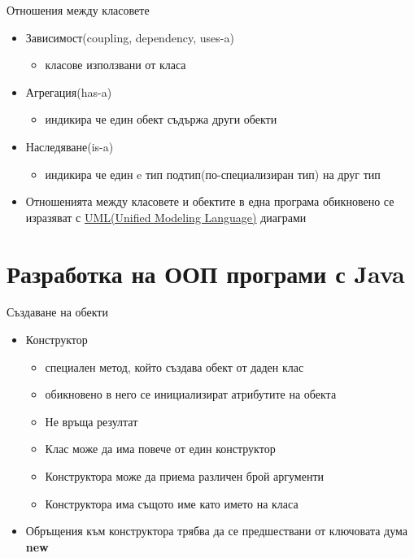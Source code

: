 \documentclass{beamer}
\begin{document}
\begin{frame}{Отношения между класовете}
  \transdissolve
  \begin{itemize}
  \item Зависимост(coupling, dependency, uses-a) \pause
    \begin{itemize}
    \item класове използвани от класа \pause
    \end{itemize}
  \item Агрегация(has-a) \pause
    \begin{itemize}
    \item индикира че един обект съдържа други обекти \pause
    \end{itemize}
  \item Наследяване(is-a) \pause
    \begin{itemize}
    \item индикира че един e тип подтип(по-специализиран тип) на друг тип
    \end{itemize}
  \item Отношенията между класовете и обектите в една програма
    обикновено се изразяват с \href{http://en.wikipedia.org/wiki/Unified_Modeling_Language}{UML(Unified Modeling Language)} диаграми
  \end{itemize}
\end{frame}

\section{Разработка на ООП програми с Java}
\begin{frame}{Създаване на обекти}
  \transdissolve
  \begin{itemize}
  \item Конструктор \pause
    \begin{itemize}
    \item специален метод, който създава обект от даден клас \pause
    \item обикновено в него се инициализират атрибутите на обекта
      \pause
    \item Не връща резултат \pause
    \item Клас може да има повече от един
      конструктор \pause
    \item Конструктора може да приема различен
      брой аргументи \pause
  \item Конструктора има същото име като името на класа \pause
    \end{itemize}
  \item Обръщения към конструктора трябва да се предшествани от
    ключовата дума
    \textbf{new}
  \end{itemize}
\end{frame}
\end{document}
